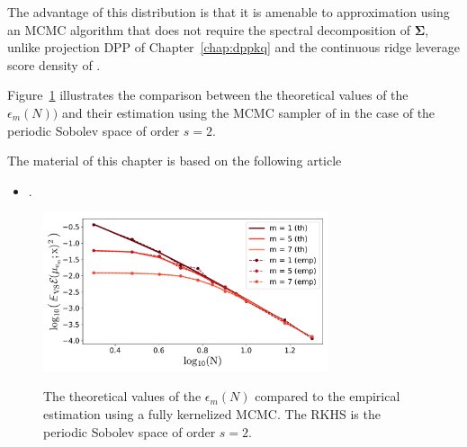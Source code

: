 \documentclass[twoside,11pt]{book}
\numberwithin{theorem}{chapter}
\numberwithin{definition}{chapter}
\numberwithin{proposition}{chapter}
\numberwithin{corollary}{chapter}
\numberwithin{example}{chapter}
\numberwithin{lemma}{chapter}
\numberwithin{assumption}{chapter}
\numberwithin{equation}{chapter}
\numberwithin{figure}{chapter}
\begin{document}
The advantage of this distribution is that it is amenable to approximation using an MCMC algorithm that does not require the spectral decomposition of $\bm{\Sigma}$, unlike projection DPP of Chapter~\ref{chap:dppkq} and the continuous ridge leverage score density of \parencite{Bac17}.

Figure~\ref{fig:introduction_VS_th_vs_exp} illustrates the comparison between the theoretical values of the $\epsilon_{m}(N))$ and their estimation using the MCMC sampler of \parencite{ReGh19} in the case of the periodic Sobolev space of order $s = 2$.


The material of this chapter is based on the following article
\begin{itemize}
\item {}.
\end{itemize}

\begin{figure}
\centering
\includegraphics[width=0.75\textwidth]{img/introduction/EX_VS_err_n_s_2_th_vs_emp_exp50.pdf}\\
\caption{ The theoretical values of the $\epsilon_{m}(N)$ compared to the empirical estimation using a fully kernelized MCMC. The RKHS is the periodic Sobolev space of order $ s=2$.
\label{fig:introduction_VS_th_vs_exp}}
\end{figure}

\end{document}

